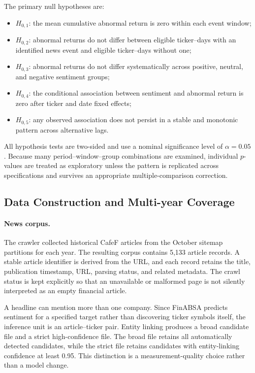 The primary null hypotheses are:
\begin{itemize}
    \item $H_{0,1}$: the mean cumulative abnormal return is zero within each event window;
    \item $H_{0,2}$: abnormal returns do not differ between eligible ticker--days with an identified news event and eligible ticker--days without one;
    \item $H_{0,3}$: abnormal returns do not differ systematically across positive, neutral, and negative sentiment groups;
    \item $H_{0,4}$: the conditional association between sentiment and abnormal return is zero after ticker and date fixed effects;
    \item $H_{0,5}$: any observed association does not persist in a stable and monotonic pattern across alternative lags.
\end{itemize}

All hypothesis tests are two-sided and use a nominal significance level of $\alpha=0.05$. Because many period--window--group combinations are examined, individual $p$-values are treated as exploratory unless the pattern is replicated across specifications and survives an appropriate multiple-comparison correction.

\subsection{Data Construction and Multi-year Coverage}
\label{subsec:multi-year-data}

\paragraph{News corpus.}
The crawler collected historical CafeF articles from the October sitemap partitions for each year. The resulting corpus contains 5,133 article records. A stable article identifier is derived from the URL, and each record retains the title, publication timestamp, URL, parsing status, and related metadata. The crawl status is kept explicitly so that an unavailable or malformed page is not silently interpreted as an empty financial article.

A headline can mention more than one company. Since FinABSA predicts sentiment for a specified target rather than discovering ticker symbols itself, the inference unit is an article--ticker pair. Entity linking produces a broad candidate file and a strict high-confidence file. The broad file retains all automatically detected candidates, while the strict file retains candidates with entity-linking confidence at least 0.95. This distinction is a measurement-quality choice rather than a model change.

